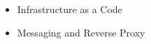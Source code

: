 
\divider

\begin{itemize}
    \item Infrastructure as a Code
\end{itemize}


\divider

\begin{itemize}
    \item Messaging and Reverse Proxy 
\end{itemize}


\divider


\bigskip
\bigskip
\bigskip
\bigskip
\bigskip
\bigskip


\clearpage
